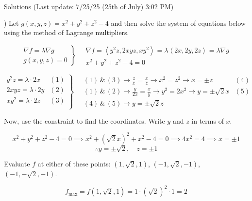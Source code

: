 \documentclass{article}
\begin{document}
\newpage

\begin{center}
Solutions (Last update: 7/25/25 (25th of July) 3:02 PM)
\end{center}

) Let $g(x,y,z)=x^2+y^2+z^2-4$ and then solve the system of equations below using the method of Lagrange multipliers.

\[
\left.
\begin{array}{ll}
\displaystyle\nabla f =\lambda \nabla g \\
\displaystyle g(x,y,z) = 0
\end{array}
\right\}\quad
\begin{array}{ll}
\nabla f = \left\langle y^2z,2xyz,xy^2\right\rangle = \lambda\left\langle2x,2y,2z\right\rangle = \lambda\nabla g \\[0.2cm] x^2+y^2+z^2-4=0
\end{array}
\]

\[
\left.
\begin{array}{ll}
\displaystyle y^2z =\lambda \cdot2x & (1)\\[0.2cm]
\displaystyle 2xyz =\lambda \cdot2y & (2)\\[0.2cm]
\displaystyle xy^2 =\lambda \cdot2z & (3)\\[0.2cm]
\end{array}
\right\}\quad
\begin{array}{ll}
\displaystyle(1)\,\&\,(3)\rightarrow\frac{z}{x}=\frac{x}{z}\rightarrow x^2=z^2\rightarrow x=\pm z&(4)\\[0.4cm]
\displaystyle(1)\,\&\,(2)\rightarrow\frac{y}{2x}=\frac{x}{y}\rightarrow y^2=2x^2\rightarrow y=\pm\sqrt{2}x&(5)\\[0.4cm]\displaystyle(4)\,\&\,(5)\rightarrow y=\pm \sqrt 2z
\end{array}
\]

\hfill

\noindent Now, use the constraint to find the coordinates. Write $y$ and $z$ in terms of $x$.

\[x^2+y^2+z^2-4=0\implies x^2+\left(\sqrt2x\right)^2+x^2-4=0\implies4x^2=4\implies x=\pm1\]
\[\therefore y=\pm\sqrt2,\quad z=\pm1\]

\hfill

\noindent Evaluate $f$ at either of these points: $(1,\sqrt2,1)$, $(-1,\sqrt2,-1)$, $(-1,-\sqrt2,-1)$.

\[f_{\text{max}}=f(1,\sqrt2,1)=1\cdot\left(\sqrt2\right)^2\cdot1=\boxed{2}\]

\hfill
\end{document}
